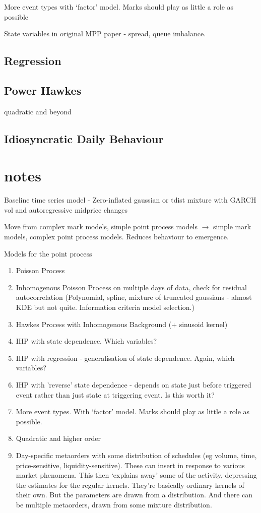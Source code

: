 \documentclass[honours,12pt]{unswthesis}
\numberwithin{equation}{section}
\begin{document}
More event types with `factor' model. Marks should play as little a role as possible

State variables in original MPP paper - spread, queue imbalance.
\subsection{Regression}

\subsection{Power Hawkes}
quadratic and beyond

\subsection{Idiosyncratic Daily Behaviour}


\section{notes}
Baseline time series model - Zero-inflated gaussian or tdist mixture with GARCH vol and autoregressive midprice changes

Move from complex mark models, simple point process models $\to$ simple mark models, complex point process models. Reduces behaviour to emergence.

Models for the point process
\begin{enumerate}
	\item Poisson Process
	\item Inhomogenous Poisson Process on multiple days of data, check for residual autocorrelation (Polynomial, spline, mixture of truncated gaussians - almost KDE but not quite. Information criteria model selection.)
	\item Hawkes Process with Inhomogenous Background (+ sinusoid kernel)
	\item IHP with state dependence. Which variables?
	\item IHP with regression - generalisation of state dependence. Again, which variables?
	\item IHP with 'reverse' state dependence - depends on state just before triggered event rather than just state at triggering event. Is this worth it?
	\item More event types. With `factor' model. Marks should play as little a role as possible.
	\item Quadratic and higher order
	\item Day-specific metaorders with some distribution of schedules (eg volume, time, price-sensitive, liquidity-sensitive). These can insert in response to various market phenomena. This then `explains away' some of the activity, depressing the estimates for the regular kernels. They're basically ordinary kernels of their own. But the parameters are drawn from a distribution. And there can be multiple metaorders, drawn from some mixture distribution.
\end{enumerate}
\end{document}
